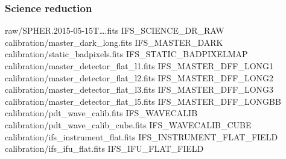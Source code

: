 \documentclass[twoside,single,12pt]{lion-msc}
\begin{document}
\subsubsection*{Science reduction}
\begin{mdframed}[linewidth = 0.3mm, linecolor = black]
raw/SPHER.2015-05-15T\dots.fits IFS\_SCIENCE\_DR\_RAW\\
calibration/master\_dark\_long.fits IFS\_MASTER\_DARK\\
calibration/static\_badpixels.fits IFS\_STATIC\_BADPIXELMAP\\
calibration/master\_detector\_flat\_l1.fits IFS\_MASTER\_DFF\_LONG1\\
calibration/master\_detector\_flat\_l2.fits IFS\_MASTER\_DFF\_LONG2\\
calibration/master\_detector\_flat\_l3.fits IFS\_MASTER\_DFF\_LONG3\\
calibration/master\_detector\_flat\_l5.fits IFS\_MASTER\_DFF\_LONGBB\\
calibration/pdt\_wave\_calib.fits IFS\_WAVECALIB\\
calibration/pdt\_wave\_calib\_cube.fits IFS\_WAVECALIB\_CUBE\\
calibration/ifs\_instrument\_flat.fits IFS\_INSTRUMENT\_FLAT\_FIELD\\
calibration/ifs\_ifu\_flat.fits IFS\_IFU\_FLAT\_FIELD
\end{mdframed}
\end{document}
